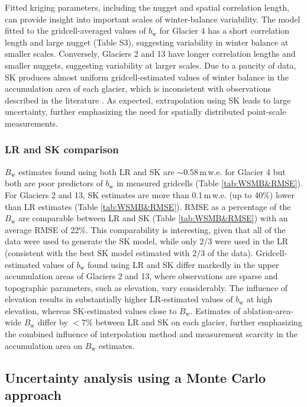 \documentclass[twocolumn, letterpaper]{igs}
\begin{document}
Fitted kriging parameters, including the nugget and spatial correlation length, can provide insight into important scales of winter-balance variability. The model fitted to the gridcell-averaged values of $b_\mathrm{w}$ for Glacier 4 has a short correlation length and large nugget (Table S3), suggesting variability in winter balance at smaller scales. Conversely, Glaciers 2 and 13 have longer correlation lengths and smaller nuggets, suggesting variability at larger scales. Due to a paucity of data, SK produces almost uniform gridcell-estimated values of winter balance in the accumulation area of each glacier, which is inconsistent with observations described in the literature \citep[e.g.][]{Machguth2006, Grabiec2011}. As expected, extrapolation using SK leads to large uncertainty, further emphasizing the need for spatially distributed point-scale measurements. 

\subsubsection{LR and SK comparison}
 
$B_\mathrm{w}$ estimates found using both LR and SK are $\sim$0.58\,m\,w.e. for Glacier 4 but both are poor predictors of  $b_\mathrm{w}$ in measured gridcells (Table \ref{tab:WSMB&RMSE}). For Glaciers 2 and 13, SK estimates are more than 0.1\,m\,w.e. (up to 40\%) lower than LR estimates (Table \ref{tab:WSMB&RMSE}). RMSE as a percentage of the $B_\mathrm{w}$ are comparable between LR and SK (Table \ref{tab:WSMB&RMSE}) with an average RMSE of 22\%. This comparability is interesting, given that all of the data were used to generate the SK model, while only 2/3 were used in the LR (consistent with the best SK model estimated with 2/3 of the data). Gridcell-estimated values of $b_\mathrm{w}$ found using LR and SK differ markedly in the upper accumulation areas of Glaciers 2 and 13, where observations are sparse and topographic parameters, such as elevation, vary considerably. The influence of elevation results in substantially higher LR-estimated values of $b_\mathrm{w}$ at high elevation, whereas SK-estimated values close to $B_\mathrm{w}$. Estimates of ablation-area-wide $B_\mathrm{w}$ differ by $<$7\% between LR and SK on each glacier, further emphasizing the combined influence of interpolation method and measurement scarcity in the accumulation area on $B_\mathrm{w}$ estimates.


\subsection{Uncertainty analysis using a Monte Carlo approach}
\end{document}
